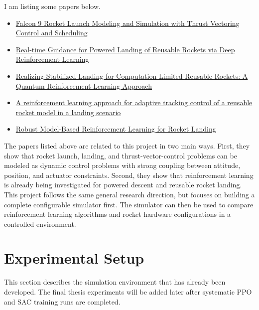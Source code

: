 \documentclass{article}
\begin{document}
I am listing some papers below.
\begin{itemize}
    \item 
    \href{https://www.researchgate.net/profile/Yazdi-Jenie/publication/340890938_Falcon_9_Rocket_Launch_Modeling_and_Simulation_with_Thrust_Vectoring_Control_and_Scheduling/links/641489c2a1b72772e4067118/Falcon-9-Rocket-Launch-Modeling-and-Simulation-with-Thrust-Vectoring-Control-and-Scheduling.pdf}{Falcon 9 Rocket Launch Modeling and Simulation with Thrust Vectoring Control and Scheduling}
    \item \href{https://ieeexplore.ieee.org/stamp/stamp.jsp?tp=&arnumber=9986540}{Real-time Guidance for Powered Landing of Reusable Rockets via Deep Reinforcement Learning}
    \item  \href{https://ieeexplore.ieee.org/stamp/stamp.jsp?arnumber=10461080}{Realizing Stabilized Landing for Computation-Limited Reusable Rockets: A Quantum Reinforcement Learning Approach}
    \item  \href{https://www.sciencedirect.com/science/article/pii/S0925231224001486}{A reinforcement learning approach for adaptive tracking control of a reusable rocket model in a landing scenario}
    \item  \href{https://ieeexplore.ieee.org/stamp/stamp.jsp?arnumber=11494205}{Robust Model-Based Reinforcement Learning for Rocket Landing}
    
\end{itemize}

The papers listed above are related to this project in two main ways. First, they show that rocket launch, landing, and thrust-vector-control problems can be modeled as dynamic control problems with strong coupling between attitude, position, and actuator constraints. Second, they show that reinforcement learning is already being investigated for powered descent and reusable rocket landing. This project follows the same general research direction, but focuses on building a complete configurable simulator first. The simulator can then be used to compare reinforcement learning algorithms and rocket hardware configurations in a controlled environment.

\section{Experimental Setup}

This section describes the simulation environment that has already been developed. The final thesis experiments will be added later after systematic PPO and SAC training runs are completed.
\end{document}
